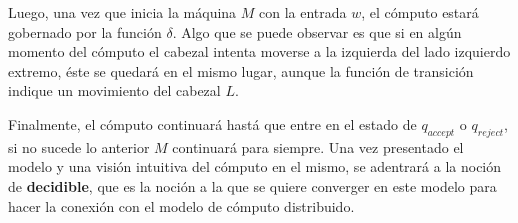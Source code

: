 \documentclass[10pt]{report}
\begin{document}
    Luego, una vez que inicia la máquina $M$ con la entrada $w$, el cómputo estará gobernado por la función $\delta$.
    Algo que se puede observar es que si en algún momento del cómputo el cabezal intenta moverse a la izquierda del lado
    izquierdo extremo, éste se quedará en el mismo lugar, aunque la función de transición indique un movimiento del cabezal $L$.
    \newline

    Finalmente, el cómputo continuará hastá que entre en el estado de $q_{accept}$ o $q_{reject}$,
    si no sucede lo anterior $M$ continuará para siempre.
    Una vez presentado el modelo y una visión intuitiva del cómputo en el mismo, se adentrará a la noción de
    \textbf{decidible}, que es la noción a la que se quiere converger en este modelo para hacer la conexión con el modelo
    de cómputo distribuido.

    \newline
\end{document}
